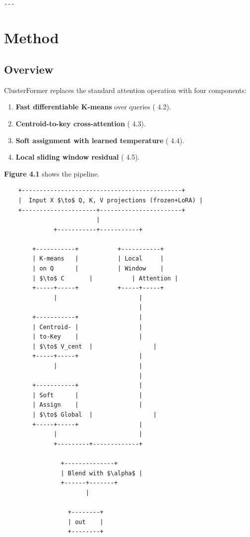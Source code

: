 \begin{lstlisting}

---
\end{lstlisting}

\section{Method}

\subsection{Overview}

ClusterFormer replaces the standard attention operation with four 
components:

\begin{enumerate}
\item \textbf{Fast differentiable K-means} over queries ( 4.2).
\item \textbf{Centroid-to-key cross-attention} ( 4.3).
\item \textbf{Soft assignment with learned temperature} ( 4.4).
\item \textbf{Local sliding window residual} ( 4.5).

\end{enumerate}
\textbf{Figure 4.1} shows the pipeline.

\begin{lstlisting}
    +---------------------------------------------+
    |  Input X $\to$ Q, K, V projections (frozen+LoRA) |
    +---------------------+-----------------------+
                          |
              +-----------+-----------+
                                       
        +-----------+           +-----------+
        | K-means   |           | Local     |
        | on Q      |           | Window    |
        | $\to$ C       |           | Attention |
        +-----+-----+           +-----+-----+
              |                       |
                                      |
        +-----------+                 |
        | Centroid- |                 |
        | to-Key    |                 |
        | $\to$ V_cent  |                 |
        +-----+-----+                 |
              |                       |
                                      |
        +-----------+                 |
        | Soft      |                 |
        | Assign    |                 |
        | $\to$ Global  |                 |
        +-----+-----+                 |
              |                       |
              +---------+-------------+
                         
                +--------------+
                | Blend with $\alpha$ |
                +------+-------+
                       |
                        
                  +--------+
                  | out    |
                  +--------+
\end{lstlisting}

